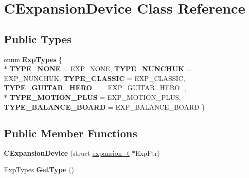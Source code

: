 \hypertarget{class_c_expansion_device}{\section{C\-Expansion\-Device Class Reference}
\label{class_c_expansion_device}
}
\subsection*{Public Types}
\begin{DoxyCompactItemize}
\item 
enum {\bfseries Exp\-Types} \{ \\*
{\bfseries T\-Y\-P\-E\-\_\-\-N\-O\-N\-E} =  E\-X\-P\-\_\-\-N\-O\-N\-E, 
{\bfseries T\-Y\-P\-E\-\_\-\-N\-U\-N\-C\-H\-U\-K} =  E\-X\-P\-\_\-\-N\-U\-N\-C\-H\-U\-K, 
{\bfseries T\-Y\-P\-E\-\_\-\-C\-L\-A\-S\-S\-I\-C} =  E\-X\-P\-\_\-\-C\-L\-A\-S\-S\-I\-C, 
{\bfseries T\-Y\-P\-E\-\_\-\-G\-U\-I\-T\-A\-R\-\_\-\-H\-E\-R\-O\-\_} =  E\-X\-P\-\_\-\-G\-U\-I\-T\-A\-R\-\_\-\-H\-E\-R\-O\-\_, 
\\*
{\bfseries T\-Y\-P\-E\-\_\-\-M\-O\-T\-I\-O\-N\-\_\-\-P\-L\-U\-S} =  E\-X\-P\-\_\-\-M\-O\-T\-I\-O\-N\-\_\-\-P\-L\-U\-S, 
{\bfseries T\-Y\-P\-E\-\_\-\-B\-A\-L\-A\-N\-C\-E\-\_\-\-B\-O\-A\-R\-D} =  E\-X\-P\-\_\-\-B\-A\-L\-A\-N\-C\-E\-\_\-\-B\-O\-A\-R\-D
 \}
\end{DoxyCompactItemize}
\subsection*{Public Member Functions}
\begin{DoxyCompactItemize}
\item 
\hypertarget{class_c_expansion_device_a68809e7c5c3736cc307e48630a7168a0}{{\bfseries C\-Expansion\-Device} (struct \hyperlink{structexpansion__t}{expansion\-\_\-t} $\ast$Exp\-Ptr)}\label{class_c_expansion_device_a68809e7c5c3736cc307e48630a7168a0}

\item 
\hypertarget{class_c_expansion_device_afe34f8c67883e2283b87332aed1b372f}{Exp\-Types {\bfseries Get\-Type} ()}\label{class_c_expansion_device_afe34f8c67883e2283b87332aed1b372f}

\end{DoxyCompactItemize}
